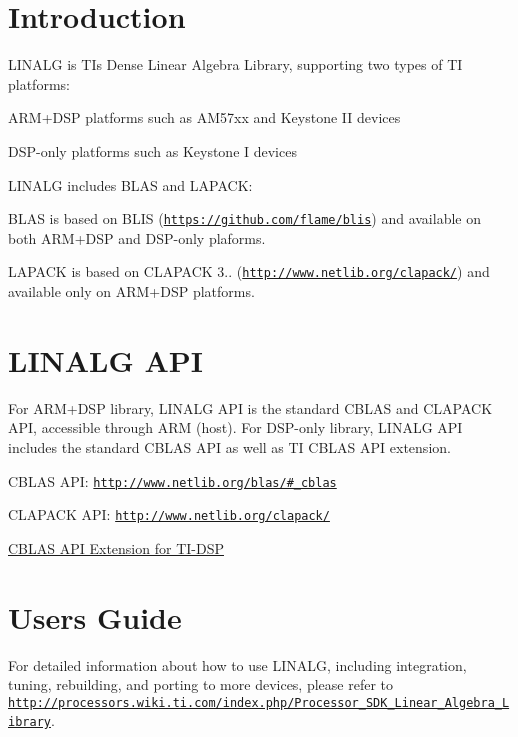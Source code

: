 \hypertarget{index_introduction}{}\section{Introduction}\label{index_introduction}
L\+I\+N\+A\+L\+G is T\+I\textquotesingle{}s Dense Linear Algebra Library, supporting two types of T\+I platforms\+:
\begin{DoxyItemize}
\item A\+R\+M+\+D\+S\+P platforms such as A\+M57xx and Keystone I\+I devices
\item D\+S\+P-\/only platforms such as Keystone I devices
\end{DoxyItemize}

L\+I\+N\+A\+L\+G includes B\+L\+A\+S and L\+A\+P\+A\+C\+K\+:
\begin{DoxyItemize}
\item B\+L\+A\+S is based on B\+L\+I\+S (\href{https://github.com/flame/blis}{\tt https\+://github.\+com/flame/blis}) and available on both A\+R\+M+\+D\+S\+P and D\+S\+P-\/only plaforms.
\item L\+A\+P\+A\+C\+K is based on C\+L\+A\+P\+A\+C\+K 3.. (\href{http://www.netlib.org/clapack/}{\tt http\+://www.\+netlib.\+org/clapack/}) and available only on A\+R\+M+\+D\+S\+P platforms.
\end{DoxyItemize}\hypertarget{index_linalg_api}{}\section{L\+I\+N\+A\+L\+G A\+P\+I}\label{index_linalg_api}
For A\+R\+M+\+D\+S\+P library, L\+I\+N\+A\+L\+G A\+P\+I is the standard C\+B\+L\+A\+S and C\+L\+A\+P\+A\+C\+K A\+P\+I, accessible through A\+R\+M (host). For D\+S\+P-\/only library, L\+I\+N\+A\+L\+G A\+P\+I includes the standard C\+B\+L\+A\+S A\+P\+I as well as T\+I C\+B\+L\+A\+S A\+P\+I extension.


\begin{DoxyItemize}
\item C\+B\+L\+A\+S A\+P\+I\+: \href{http://www.netlib.org/blas/#_cblas}{\tt http\+://www.\+netlib.\+org/blas/\#\+\_\+cblas}
\item C\+L\+A\+P\+A\+C\+K A\+P\+I\+: \href{http://www.netlib.org/clapack/}{\tt http\+://www.\+netlib.\+org/clapack/}
\item \hyperlink{group__ti__cblas__api}{C\+B\+L\+A\+S A\+P\+I Extension for T\+I-\/\+D\+S\+P}
\end{DoxyItemize}\hypertarget{index_linalg_ug}{}\section{User\textquotesingle{}s Guide}\label{index_linalg_ug}
For detailed information about how to use L\+I\+N\+A\+L\+G, including integration, tuning, rebuilding, and porting to more devices, please refer to \href{http://processors.wiki.ti.com/index.php/Processor_SDK_Linear_Algebra_Library}{\tt http\+://processors.\+wiki.\+ti.\+com/index.\+php/\+Processor\+\_\+\+S\+D\+K\+\_\+\+Linear\+\_\+\+Algebra\+\_\+\+Library}. 